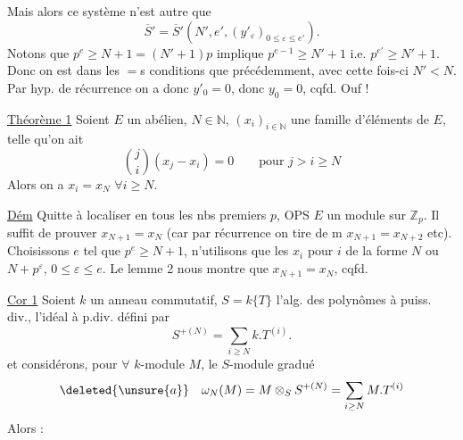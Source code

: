 
Mais alors ce système n'est autre que
\[
\overline S'=\overline S'(N',e',(y'_\varepsilon)_{0\leq\varepsilon\leq e'}).
\]
Notons que $p^e\geq N+1=(N'+1)p$ implique $p^{e-1}\geq N'+1$ i.e. $p^{e'}\geq N'+1$. Donc on est dans les $=$s conditions que précédemment, avec cette fois-ci $N'<N$. Par hyp. de récurrence on a donc $y'_0=0$, donc $y_0=0$, cqfd. Ouf !

\uline{Théorème 1} Soient $E$ un  abélien, $N\in\mathbb N$, $(x_i)_{i\in\mathbb N}$ une famille d'éléments de $E$, telle qu'on ait
\[
\binom ji(x_j-x_i)=0\qquad\text{pour }j>i\geq N
\]
Alors on a $x_i=x_N$ $\forall i\geq N$.

\uline{Dém} Quitte à localiser en tous les nbs premiers $p$, OPS $E$ un module sur  $\mathbb Z_p$. Il suffit de prouver $x_{N+1}=x_N$ (car par récurrence on tire de m $x_{N+1}=x_{N+2}$ etc). Choisissons $e$  tel que $p^e\geq N+1$, n'utilisons que les $x_i$ pour $i$ de la forme $N$ ou $N+p^\varepsilon$, $0\leq\varepsilon\leq e$. Le lemme 2 nous montre que $x_{N+1}=x_N$, cqfd.

\uline{Cor 1} Soient $k$ un anneau commutatif, $S=k\{T\}$ l'alg. des polynômes à puiss. div.,   l'idéal à p.div.  défini par
\[
S^{+(N)}=\sum_{i\geq N}k.T^{(i)}.
\]
et considérons, pour $\forall$ $k$-module $M$, le $S$-module gradué
\[
\deleted{\unsure{a}}\quad\omega_N(M)=M\otimes_S S^{+(N)}=\sum_{i\geq N}M.T^{(i)}
\]
Alors :

